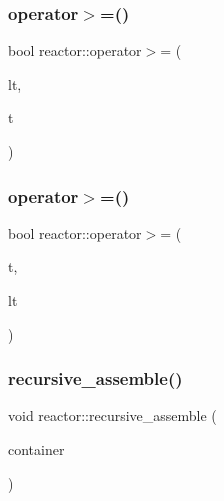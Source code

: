 \mbox{\label{namespacereactor_aba36ee73a806348027f3a8468faa0dc4}} 
\subsubsection{\texorpdfstring{operator$>$=()}{operator>=()}\hspace{0.1cm}{\footnotesize\ttfamily [2/3]}}
{\footnotesize\ttfamily bool reactor\+::operator$>$= (\begin{DoxyParamCaption}\item[{const \hyperlink{classreactor_1_1LogicalTime}{Logical\+Time} \&}]{lt,  }\item[{const \hyperlink{classreactor_1_1Tag}{Tag} \&}]{t }\end{DoxyParamCaption})\hspace{0.3cm}{\ttfamily [inline]}}

\mbox{\label{namespacereactor_adb34cd1dff4f0af83c099efae8c2f0cc}} 
\subsubsection{\texorpdfstring{operator$>$=()}{operator>=()}\hspace{0.1cm}{\footnotesize\ttfamily [3/3]}}
{\footnotesize\ttfamily bool reactor\+::operator$>$= (\begin{DoxyParamCaption}\item[{const \hyperlink{classreactor_1_1Tag}{Tag} \&}]{t,  }\item[{const \hyperlink{classreactor_1_1LogicalTime}{Logical\+Time} \&}]{lt }\end{DoxyParamCaption})\hspace{0.3cm}{\ttfamily [inline]}}

\mbox{\label{namespacereactor_a50e4996eb605ff7e10a26dcdbae25340}} 
\subsubsection{\texorpdfstring{recursive\+\_\+assemble()}{recursive\_assemble()}}
{\footnotesize\ttfamily void reactor\+::recursive\+\_\+assemble (\begin{DoxyParamCaption}\item[{\hyperlink{classreactor_1_1Reactor}{Reactor} $\ast$}]{container }\end{DoxyParamCaption})}

